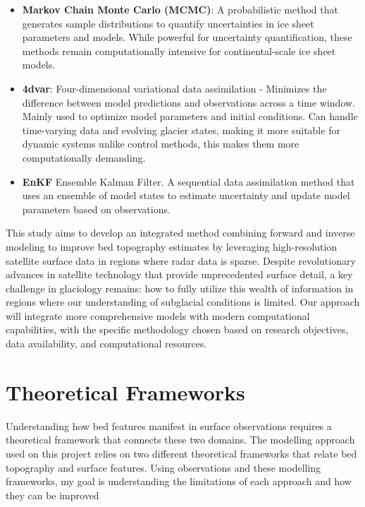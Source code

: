 \begin{itemize}
\begin{itemize}
            \item\textbf{Markov Chain Monte Carlo (MCMC)}: A probabilistic method that generates sample distributions to quantify uncertainties in ice sheet parameters and models\cite{Morlighem_Goldberg_2024}. While powerful for uncertainty quantification, these methods remain computationally intensive for continental-scale ice sheet models\cite{Morlighem_Goldberg_2024}.

            \item\textbf{4dvar}: Four-dimensional variational data assimilation - Minimizes the difference between model predictions and observations across a time window. Mainly used to optimize model parameters and initial conditions\cite{Morlighem_Goldberg_2024}. Can handle time-varying data and evolving glacier states, making it more suitable for dynamic systems unlike control methods, this makes them more computationally demanding\cite{Morlighem_Goldberg_2024}.

            \item\textbf{EnKF} Ensemble Kalman Filter. A sequential data assimilation method that uses an ensemble of model states to estimate uncertainty and update model parameters based on observations\cite{Morlighem_Goldberg_2024}.
        \end{itemize}
    
\end{itemize} 
This study aims to develop an integrated method combining forward and inverse modeling to improve bed topography estimates by leveraging high-resolution satellite surface data in regions where radar data is sparse. Despite revolutionary advances in satellite technology that provide unprecedented surface detail, a key challenge in glaciology remains: how to fully utilize this wealth of information in regions where our understanding of subglacial conditions is limited. Our approach will integrate more comprehensive models with modern computational capabilities, with the specific methodology chosen based on research objectives, data availability, and computational resources.

\newpage
\section{Theoretical Frameworks}
 Understanding how bed features manifest in surface observations requires a theoretical framework that connects these two domains. The modelling approach used on this project relies on two different theoretical frameworks that relate bed topography and surface features. Using observations and these modelling frameworks, my goal is understanding the limitations of each approach and how they can be improved

